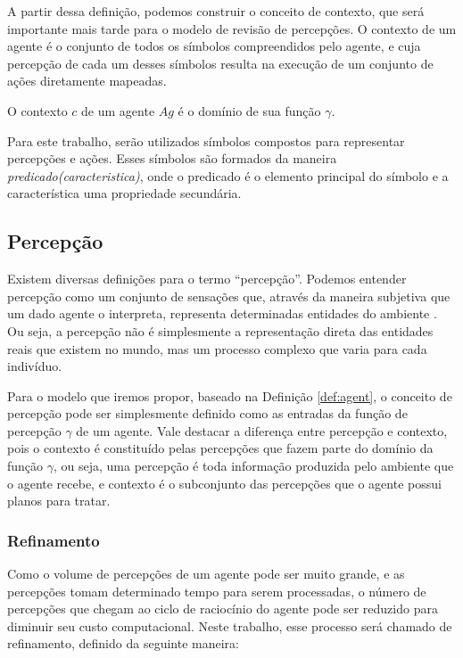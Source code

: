 A partir dessa definição, podemos construir o conceito de contexto, que será importante mais tarde para o modelo de revisão de percepções. O contexto de um agente é o conjunto de todos os símbolos compreendidos pelo agente, e cuja percepção de cada um desses símbolos resulta na execução de um conjunto de ações diretamente mapeadas.

\vspace{0.2cm}

\begin{definition}
    O contexto $c$ de um agente $Ag$ é o domínio de sua função $\gamma$.
    \label{definition::context}
\end{definition}{}

Para este trabalho, serão utilizados símbolos compostos para representar percepções e ações. Esses símbolos são formados da maneira \emph{predicado(caracteristica)}, onde o predicado é o elemento principal do símbolo e a característica uma propriedade secundária.

\subsection{Percepção}

Existem diversas definições para o termo ``percepção''. Podemos entender percepção como um conjunto de sensações que, através da maneira subjetiva que um dado agente o interpreta, representa determinadas entidades do ambiente \cite{gibson1950perception}. Ou seja, a percepção não é simplesmente a representação direta das entidades reais que existem no mundo, mas um processo complexo que varia para cada indivíduo.

Para o modelo que iremos propor, baseado na Definição \ref{def:agent}, o conceito de percepção pode ser simplesmente definido como as entradas da função de percepção $\gamma$ de um agente. Vale destacar a diferença entre percepção e contexto, pois o contexto é constituído pelas percepções que fazem parte do domínio da função $\gamma$, ou seja, uma percepção é toda informação produzida pelo ambiente que o agente recebe, e contexto é o subconjunto das percepções que o agente possui planos para tratar.

\subsubsection{Refinamento}

Como o volume de percepções de um agente pode ser muito grande, e as percepções tomam determinado tempo para serem processadas, o número de percepções que chegam ao ciclo de raciocínio do agente pode ser reduzido para diminuir seu custo computacional. Neste trabalho, esse processo será chamado de refinamento, definido da seguinte maneira:

